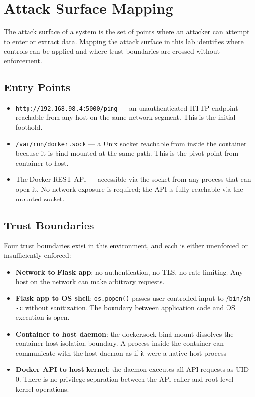
\section{Attack Surface Mapping}

The attack surface of a system is the set of points where an attacker can attempt to enter or extract data. Mapping the attack surface in this lab identifies where controls can be applied and where trust boundaries are crossed without enforcement.

\subsection{Entry Points}

\begin{itemize}
    \item \texttt{http://192.168.98.4:5000/ping} --- an unauthenticated HTTP endpoint reachable from any host on the same network segment. This is the initial foothold.
    \item \texttt{/var/run/docker.sock} --- a Unix socket reachable from inside the container because it is bind-mounted at the same path. This is the pivot point from container to host.
    \item The Docker REST API --- accessible via the socket from any process that can open it. No network exposure is required; the API is fully reachable via the mounted socket.
\end{itemize}

\subsection{Trust Boundaries}

Four trust boundaries exist in this environment, and each is either unenforced or insufficiently enforced:

\begin{itemize}
    \item \textbf{Network to Flask app}: no authentication, no TLS, no rate limiting. Any host on the network can make arbitrary requests.
    \item \textbf{Flask app to OS shell}: \texttt{os.popen()} passes user-controlled input to \texttt{/bin/sh -c} without sanitization. The boundary between application code and OS execution is open.
    \item \textbf{Container to host daemon}: the docker.sock bind-mount dissolves the container-host isolation boundary. A process inside the container can communicate with the host daemon as if it were a native host process.
    \item \textbf{Docker API to host kernel}: the daemon executes all API requests as UID 0. There is no privilege separation between the API caller and root-level kernel operations.
\end{itemize}

